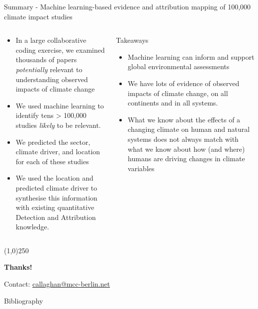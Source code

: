 \documentclass[9pt]{beamer}
\begin{document}
\begin{frame}{Summary - Machine learning-based evidence and attribution mapping of 100,000 climate impact studies}

\begin{columns}
	\small
	\begin{column}{0.5\linewidth}
		\begin{itemize}
			\item In a large collaborative coding exercise, we examined thousands of papers \textit{potentially} relevant to understanding observed impacts of climate change
			\item We used machine learning to identify tens > 100,000 studies \textit{likely} to be relevant.
			\item We predicted the sector, climate driver, and location for each of these studies
			\item We used the location and predicted climate driver to synthesise this information with existing quantitative Detection and Attribution knowledge.
		\end{itemize}
	\end{column}

	\begin{column}{0.5\linewidth}
		
		\begin{block}{Takeaways}
			\begin{itemize}
				\item Machine learning can inform and support global environmental assessments
				\item We have lots of evidence of observed impacts of climate change, on all continents and in all systems.
				\item What we know about the effects of a changing climate on human and natural systems does not always match with what we know about how (and where) humans are driving changes in climate variables 
			\end{itemize}
		\end{block}
		
	\end{column}
\end{columns}



\begin{center}
	\line(1,0){250}
	
	\medskip
	
	\textbf{Thanks!}
	
	\medskip
	
	Contact: \url{callaghan@mcc-berlin.net}

\end{center}



\end{frame}

\begin{frame}{Bibliography}

\end{frame}
\end{document}
